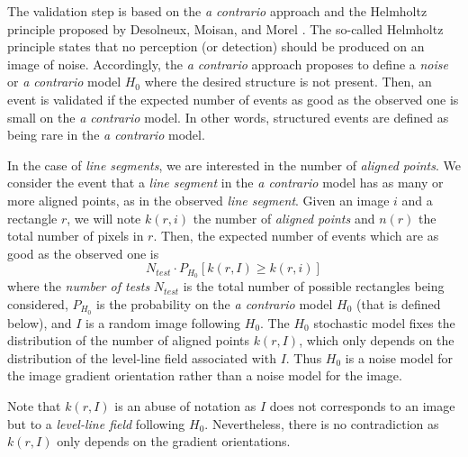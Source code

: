 \documentclass{ipol}
\begin{document}
The validation step is based on the \emph{a contrario} approach and
the Helmholtz principle proposed by Desolneux, Moisan, and Morel
\cite{dmm2000,dmm2008}. The so-called Helmholtz principle states
that no perception (or detection) should be produced on an image of
noise. Accordingly, the \emph{a contrario} approach proposes to define
a \emph{noise} or \emph{a contrario} model $H_0$ where the desired
structure is not present. Then, an event is validated if the expected
number of events as good as the observed one is small on the \emph{a
contrario} model. In other words, structured events are defined as
being rare in the \emph{a contrario} model.

In the case of \emph{line segments}, we are interested in the number
of \emph{aligned points}. We consider the event that a \emph{line
segment} in the \emph{a contrario} model has as many or more aligned
points, as in the observed \emph{line segment}. Given an image $i$ and
a rectangle $r$, we will note $k(r,i)$ the number of \emph{aligned
points} and $n(r)$ the total number of pixels in $r$. Then, the
expected number of events which are as good as the observed one is
\begin{equation}
   N_{test} \cdot P_{H_0}[k(r,I)\geq k(r,i)]
\end{equation}
where the \emph{number of tests} $N_{test}$ is the total number of
possible rectangles being considered, $P_{H_0}$ is the probability on
the \emph{a contrario} model $H_0$ (that is defined below), and $I$ is
a random image following $H_0$. The $H_0$ stochastic model fixes the
distribution of the number of aligned points $k(r,I)$, which only
depends on the distribution of the level-line field associated with
$I$. Thus $H_0$ is a noise model for the image gradient orientation
rather than a noise model for the image.

Note that $k(r,I)$ is an abuse of notation as $I$ does not corresponds
to an image but to a \emph{level-line field} following
$H_0$. Nevertheless, there is no contradiction as $k(r,I)$ only
depends on the gradient orientations.
\end{document}
